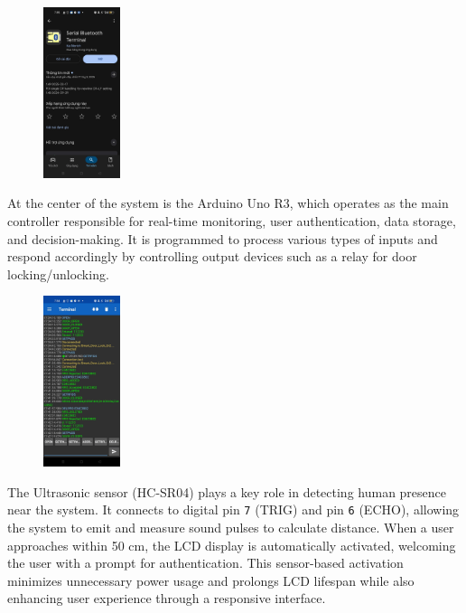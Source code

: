 \documentclass[conference, onecolumn]{IEEEtran}
\begin{document}
\begin{figure}[H]
	\centering
	\includegraphics[width=0.2\textwidth]{z6844980615115_5eaad1d876e79f6f298e16e523106730.jpg}
\end{figure}	

At the center of the system is the Arduino Uno R3, which operates as the main controller responsible for real-time monitoring, user authentication, data storage, and decision-making. It is programmed to process various types of inputs and respond accordingly by controlling output devices such as a relay for door locking/unlocking.

\begin{figure}[H]
	\centering
	\includegraphics[width=0.2\textwidth]{z6844980631319_ed6547c27e0b4fd7fc6d74ca491227c5.jpg}
\end{figure}

The Ultrasonic sensor (HC-SR04) plays a key role in detecting human presence near the system. It connects to digital pin \texttt{7} (TRIG) and pin \texttt{6} (ECHO), allowing the system to emit and measure sound pulses to calculate distance. When a user approaches within 50 cm, the LCD display is automatically activated, welcoming the user with a prompt for authentication. This sensor-based activation minimizes unnecessary power usage and prolongs LCD lifespan while also enhancing user experience through a responsive interface.
\end{document}
